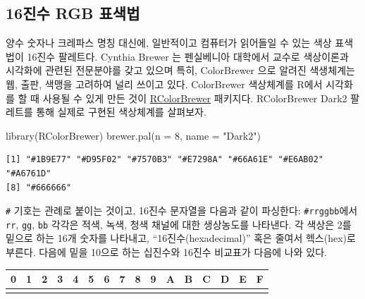 \documentclass[
  letterpaper,
]{book}
\newenvironment{Shaded}{\begin{snugshade}}{\end{snugshade}}
\newcommand{\AttributeTok}[1]{\textcolor[rgb]{0.40,0.45,0.13}{#1}}
\newcommand{\DecValTok}[1]{\textcolor[rgb]{0.68,0.00,0.00}{#1}}
\newcommand{\FunctionTok}[1]{\textcolor[rgb]{0.28,0.35,0.67}{#1}}
\newcommand{\NormalTok}[1]{\textcolor[rgb]{0.00,0.23,0.31}{#1}}
\newcommand{\StringTok}[1]{\textcolor[rgb]{0.13,0.47,0.30}{#1}}
\begin{document}
\hypertarget{color-dataviz-mechanism-rgb}{%
\subsection{16진수 RGB 표색법}\label{color-dataviz-mechanism-rgb}}

양수 숫자나 크레파스 명칭 대신에, 일반적이고 컴퓨터가 읽어들일 수 있는
색상 표색법이 16진수 팔레트다. Cynthia Brewer 는 펜실베니아 대학에서
교수로 색상이론과 시각화에 관련된 전문분야를 갖고 있으며 특히,
ColorBrewer 으로 알려진 색생체계는 웹, 출판, 색맹을 고려하여 널리 쓰이고
있다. ColorBrewer 색상체계를 R에서 시각화를 할 때 사용될 수 있게 만든
것이
\href{https://cran.r-project.org/web/packages/RColorBrewer/index.html}{RColorBrewer}
패키지다. RColorBrewer Dark2 팔레트를 통해 실제로 구현된 색상체계를
살펴보자.

\begin{Shaded}
\begin{Highlighting}[]
\FunctionTok{library}\NormalTok{(RColorBrewer)}
\FunctionTok{brewer.pal}\NormalTok{(}\AttributeTok{n =} \DecValTok{8}\NormalTok{, }\AttributeTok{name =} \StringTok{"Dark2"}\NormalTok{)}
\end{Highlighting}
\end{Shaded}

\begin{verbatim}
[1] "#1B9E77" "#D95F02" "#7570B3" "#E7298A" "#66A61E" "#E6AB02" "#A6761D"
[8] "#666666"
\end{verbatim}

\texttt{\#} 기호는 관례로 붙이는 것이고, 16진수 문자열을 다음과 같이
파싱한다: \texttt{\#rrggbb}에서 \texttt{rr}, \texttt{gg}, \texttt{bb}
각각은 적색, 녹색, 청색 채널에 대한 생상농도를 나타낸다. 각 색상은 2를
밑으로 하는 16개 숫자를 나타내고, ``16진수(hexadecimal)'' 혹은 줄여서
헥스(hex)로 부른다. 다음에 밑을 10으로 하는 십진수와 16진수 비교표가
다음에 나와 있다.

\begin{table}[!h]
\centering
\begin{tabular}[t]{l|l|l|l|l|l|l|l|l|l|l|l|l|l|l|l}
\hline
0 & 1 & 2 & 3 & 4 & 5 & 6 & 7 & 8 & 9 & A & B & C & D & E & F\\
\hline
\cellcolor{gray!6}{0} & \cellcolor{gray!6}{1} & \cellcolor{gray!6}{2} & \cellcolor{gray!6}{3} & \cellcolor{gray!6}{4} & \cellcolor{gray!6}{5} & \cellcolor{gray!6}{6} & \cellcolor{gray!6}{7} & \cellcolor{gray!6}{8} & \cellcolor{gray!6}{9} & \cellcolor{gray!6}{10} & \cellcolor{gray!6}{11} & \cellcolor{gray!6}{12} & \cellcolor{gray!6}{13} & \cellcolor{gray!6}{14} & \cellcolor{gray!6}{15}\\
\hline
\end{tabular}
\end{table}
\end{document}
